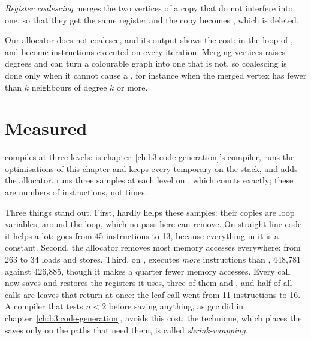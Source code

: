 \begin{definition}\label{def:b3:program-optimisation:coalescing}
\emph{Register coalescing} merges the two vertices of a copy  that do not interfere into one, so that they get the same register and the copy becomes , which is deleted.
\end{definition}

Our allocator does not coalesce, and its output shows the cost: in the loop of ,  and  become  instructions executed on every iteration. Merging vertices raises degrees and can turn a colourable graph into one that is not, so coalescing is done only when it cannot cause a , for instance when the merged vertex has fewer than $k$ neighbours of degree $k$ or more.

\section{Measured}\label{sec:b3:program-optimisation:measured}

 compiles at three levels:  is chapter~\ref{ch:b3:code-generation}'s compiler,  runs the optimisations of this chapter and keeps every temporary on the stack, and  adds the allocator.  runs three samples at each level on , which counts exactly; these are numbers of instructions, not times.

\label{out:b3:program-optimisation:measured}

Three things stand out. First,  hardly helps these samples: their copies are loop variables,  around the loop, which no pass here can remove. On straight-line code it helps a lot:  goes from 45 instructions to 13, because everything in it is a constant. Second, the allocator removes most memory accesses everywhere:  from 263 to 34 loads and stores. Third, on ,  executes \emph{more} instructions than , 448,781 against 426,885, though it makes a quarter fewer memory accesses. Every call now saves and restores the  registers it uses, three of them and , and half of all calls are leaves that return at once: the leaf call went from 11 instructions to 16. A compiler that tests $n < 2$ before saving anything, as gcc did in chapter~\ref{ch:b3:code-generation}, avoids this cost; the technique, which places the saves only on the paths that need them, is called \emph{shrink-wrapping}.


